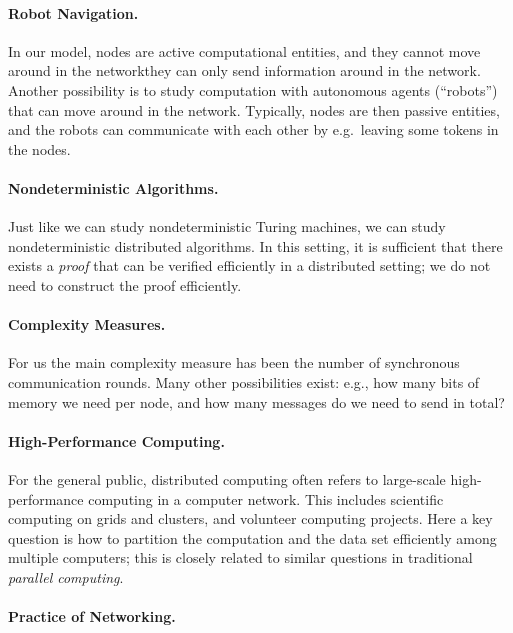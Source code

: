 \paragraph{Robot Navigation.}

In our model, nodes are active computational entities, and they cannot move around in the network\mydash they can only send information around in the network. Another possibility is to study computation with autonomous agents (``robots'') that can move around in the network. Typically, nodes are then passive entities, and the robots can communicate with each other by e.g.\ leaving some tokens in the nodes.


\paragraph{Nondeterministic Algorithms.}

Just like we can study nondeterministic Turing machines, we can study nondeterministic distributed algorithms. In this setting, it is sufficient that there exists a \emph{proof} that can be verified efficiently in a distributed setting; we do not need to construct the proof efficiently.


\paragraph{Complexity Measures.}

For us the main complexity measure has been the number of synchronous communication rounds. Many other possibilities exist: e.g., how many bits of memory we need per node, and how many messages do we need to send in total?


\paragraph{High-Performance Computing.}

For the general public, distributed computing often refers to large-scale high-performance computing in a computer network. This includes scientific computing on grids and clusters, and volunteer computing projects. Here a key question is how to partition the computation and the data set efficiently among multiple computers; this is closely related to similar questions in traditional \emph{parallel computing}.


\paragraph{Practice of Networking.}

